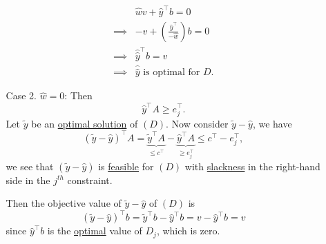 \begin{explanation}
\begin{enumerate}
\begin{enumerate}
				      \[
					      \begin{split}
						      &\hat{w} v + \hat{y}^{\top}b = 0\\
						      \implies& -v + \left( \frac{\hat{y}^{\top}}{-\hat{w}} \right) b = 0\\
						      \implies& \hat{\hat{y}}^{\top}b = v\\
						      \implies& \hat{\hat{y}} \text{ is optimal for }D.
					      \end{split}
				      \]
			      \item[Case 2.] \(\hat{w} = 0\): Then
				      \[
					      \hat{y}^{\top}A\geq e_{j}^{\top}.
				      \]
				      Let \(\widetilde{y}\) be an \hyperref[def:optimal-solution]{optimal solution} of \((D)\). Now consider \(\widetilde{y} - \hat{y}\), we have
				      \[
					      \left(\widetilde{y} - \hat{y}\right)^{\top}A = \underbrace{\widetilde{y}^{\top}A}_{\leq c^{\top}} - \underbrace{\hat{y}^{\top}A}_{\geq e_{j}^{\top}} \leq c^{\top} - e_{j}^{\top},
				      \]
				      we see that \(\left( \widetilde{y} - \hat{y} \right) \) is \hyperref[def:feasible-solution]{feasible} for \((D)\) with \hyperref[def:slack-variable]{slackness}
				      in the right-hand side in the \(j^{th}\) constraint.

				      Then the objective value of \(\widetilde{y}-\hat{y}\) of \((D)\) is
				      \[
					      \left( \widetilde{y}-\hat{y} \right)^{\top}b = \widetilde{y}^{\top}b - \hat{y}^{\top}b = v - \hat{y}^{\top}b = v
				      \]
				      since \(\hat{y}^{\top}b\) is the \hyperref[def:optimal-solution]{optimal} value of \(D_{j}\), which is zero.
		      \end{enumerate}
	\end{enumerate}


\end{explanation}
